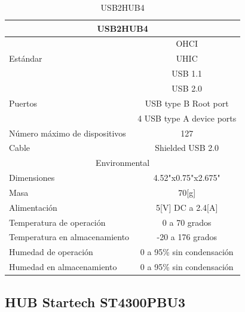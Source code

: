 \documentclass[user_manual.tex]{subfiles}
\begin{document}
\begin{table}[H]
\begin{center}
\begin{tabular}{|l|l|}%


\hline
\multicolumn{2}{|c|}{USB2HUB4} \\ \hline %
\multirow{3}{1cm}{Estándar} & \multicolumn{1}{|c|}{OHCI}\\ & \multicolumn{1}{|c|}{UHIC}\\ & \multicolumn{1}{|c|}{USB 1.1}\\ & \multicolumn{1}{|c|}{USB 2.0}\\ \hline
Puertos & \multicolumn{1}{|c|}{USB type B Root port}\\ &\multicolumn{1}{|c|}{4 USB type A device ports}\\ \hline
Número máximo de dispositivos & \multicolumn{1}{|c|}{127}\\ \hline
Cable & \multicolumn{1}{|c|}{Shielded USB 2.0}\\ \hline
\multicolumn{2}{|c|}{Environmental}\\ \hline
Dimensiones & \multicolumn{1}{|c|}{4.52"x0.75"x2.675"}\\ \hline
Masa & \multicolumn{1}{|c|}{70[g]}\\ \hline
Alimentación & \multicolumn{1}{|c|}{5[V] DC a 2.4[A]}\\ \hline
Temperatura de operación & \multicolumn{1}{|c|}{0 a 70 grados}\\ \hline
Temperatura en almacenamiento & \multicolumn{1}{|c|}{-20 a 176 grados}\\ \hline
Humedad de operación & \multicolumn{1}{|c|}{0 a 95\% sin condensación}\\ \hline
Humedad en almacenamiento & \multicolumn{1}{|c|}{0 a 95\% sin condensación}\\ \hline

\end{tabular}
\caption{USB2HUB4}
\label{Datos del USB2HUB4}
\end{center}
\end{table}

\subsection{HUB Startech ST4300PBU3}
\end{document}
